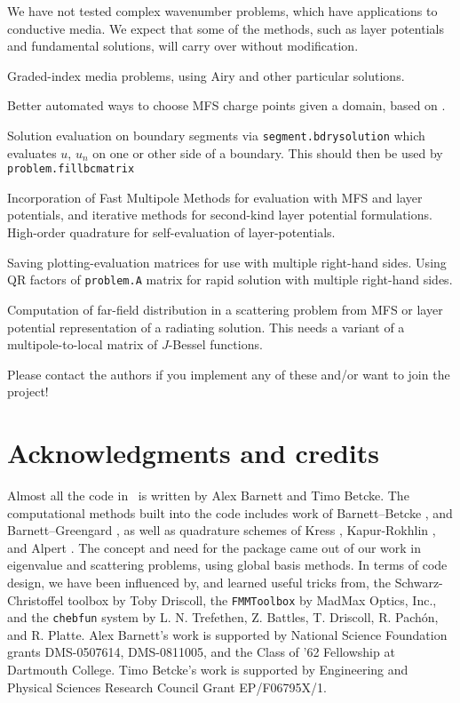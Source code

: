 \documentclass[12pt]{article}
\begin{document}
\item We have not tested complex wavenumber problems, which have
applications to conductive media. We expect that some of the
methods, such as layer potentials and fundamental solutions,
will carry over without modification.

\item Graded-index media problems, using Airy and other particular
solutions.

\item Better automated ways to choose MFS charge points given a domain,
based on \cite{mfs}.

\item Solution evaluation on boundary segments via {\tt segment.bdrysolution}
 which evaluates $u$, $u_n$ on one
or other side of a boundary.
This should then be used by {\tt problem.fillbcmatrix}

\item Incorporation of Fast Multipole Methods for evaluation with MFS and
layer potentials, and iterative
methods for second-kind layer potential formulations.
High-order quadrature for self-evaluation of layer-potentials.

\item Saving plotting-evaluation matrices
for use with multiple right-hand sides.
Using QR factors of {\tt problem.A} matrix
for rapid solution with multiple right-hand sides.

\item Computation of far-field distribution in a scattering problem
from MFS or layer potential
representation of a radiating solution. This needs a variant of a
multipole-to-local matrix of $J$-Bessel functions.
\ei

Please contact the authors if you implement any of these and/or want
to join the project!



\section{Acknowledgments and credits}

Almost all the code in \mpspack\ is written by 
Alex Barnett and Timo Betcke.
The computational methods built into the code includes
work of Barnett--Betcke \cite{mfs,mush,polygonscatt},
and Barnett--Greengard \cite{qplp,qpsc},
as well as quadrature schemes of Kress \cite{coltonkress},
Kapur-Rokhlin \cite{kapur}, and Alpert \cite{alpert}.
The concept and need for the package came out of our work in eigenvalue
and scattering problems, using global basis methods.
In terms of code design, we
have been influenced by, and learned useful tricks from,
the Schwarz-Christoffel toolbox by Toby Driscoll,
the {\tt FMMToolbox} by MadMax Optics, Inc.,
and the {\tt chebfun} system
by L. N. Trefethen, Z. Battles, T. Driscoll, R. Pach\'{o}n, and R. Platte.
Alex Barnett's work is supported by National Science Foundation
grants DMS-0507614, DMS-0811005, and the Class of '62 Fellowship at
Dartmouth College.
Timo Betcke's work is supported
by Engineering and Physical Sciences Research Council Grant EP/F06795X/1.
\end{document}
